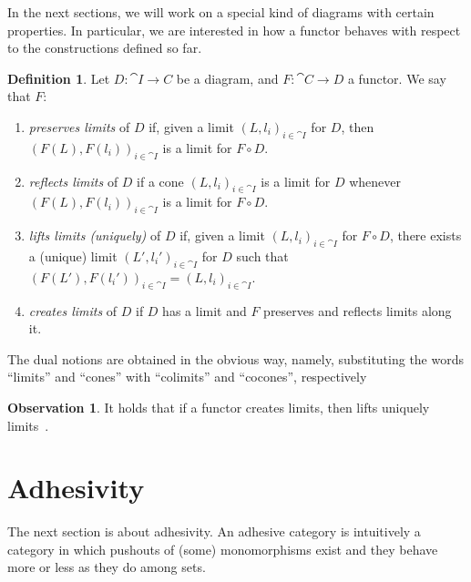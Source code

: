 \documentclass[a4paper, twoside,openright]{report}
\theoremstyle{plain}
\theoremstyle{definition}
\newtheorem{definition}[theorem]{Definition}
\newtheorem{obs}[theorem]{Observation}
\begin{document}
In the next sections, we will work on a special kind of diagrams with certain properties. In particular, we are interested in how a functor behaves with respect to the constructions defined so far.

\begin{definition}
    Let $D : \cat{I \rightarrow C}$ be a diagram, and $F: \cat{C \rightarrow D}$ a functor. We say that $F$:
    \begin{enumerate}
        \item \emph{preserves limits} of $D$ if, given a limit $(L, l_i)_{i \in \cat I}$ for $D$, then $(F(L), F(l_i))_{i \in \cat I}$ is a limit for $F \circ D$.
        \item \emph{reflects limits} of $D$ if a cone $(L, l_i)_{i \in \cat I}$ is a limit for $D$ whenever $(F(L), F(l_i))_{i \in \cat I}$ is a limit for $F \circ D$.
        \item \emph{lifts limits (uniquely)} of $D$ if, given a limit $(L, l_i)_{i \in \cat I}$ for $F \circ D$, there exists a (unique) limit $(L', l_i')_{i \in \cat I}$ for $D$ such that $(F(L'), F(l_i'))_{i \in \cat I} = (L, l_i)_{i \in \cat I}$.
        \item \emph{creates limits} of $D$ if $D$ has a limit and $F$ preserves and reflects limits along it.
    \end{enumerate}
    The dual notions are obtained in the obvious way, namely, substituting the words ``limits'' and ``cones'' with ``colimits'' and ``cocones'', respectively
\end{definition}

\begin{obs}\label{obs:funct_creat_lim_then_lift}
    It holds that if a functor creates limits, then lifts uniquely limits~\cite{Adamek_Herrlich_Strecker_2009}.
\end{obs}

\section{Adhesivity}\label{sect:adh}

The next section is about adhesivity.
An adhesive category is intuitively a category in which pushouts of (some) monomorphisms exist and they behave more or less as they do among sets. 
\end{document}
